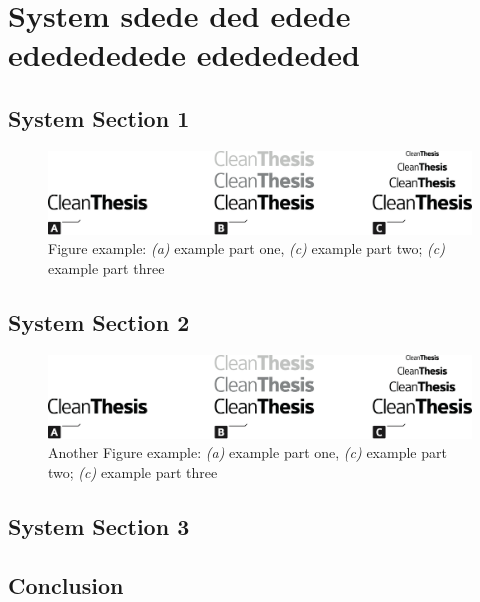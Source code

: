 %
\chapter{System sdede ded edede ededededede ededededed}
\label{sec:system}


\Blindtext[2][1]

\section{System Section 1}
\label{sec:system:sec1}

\Blindtext[1][2]

\begin{figure}[htb]
	\includegraphics[width=\textwidth]{gfx/Clean-Thesis-Figure}
	\caption{Figure example: \textit{(a)} example part one, \textit{(c)} example part two; \textit{(c)} example part three}
	\label{fig:system:example1}
\end{figure}

\Blindtext[1][2]

\section{System Section 2}
\label{sec:system:sec2}

\Blindtext[1][2]

\begin{figure}[htb]
	\includegraphics[width=\textwidth]{gfx/Clean-Thesis-Figure}
	\caption{Another Figure example: \textit{(a)} example part one, \textit{(c)} example part two; \textit{(c)} example part three}
	\label{fig:system:example2}
\end{figure}

\Blindtext[2][2]

\section{System Section 3}
\label{sec:system:sec3}

\Blindtext[4][2]

\section{Conclusion}
\label{sec:system:conclusion}

\Blindtext[2][1]
